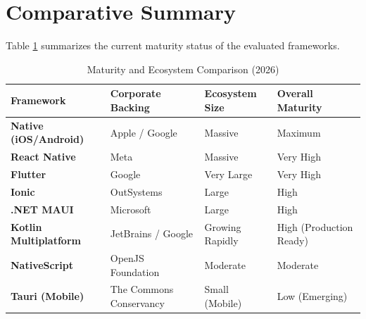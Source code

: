 \section{Comparative Summary}

Table \ref{tab:maturity_summary} summarizes the current maturity status of the evaluated frameworks.

\begin{table}[h]
\centering
\caption{Maturity and Ecosystem Comparison (2026)}
\label{tab:maturity_summary}
\renewcommand{\arraystretch}{1.3}
\begin{tabularx}{\textwidth}{|l|X|X|X|}
\hline
\textbf{Framework} & \textbf{Corporate Backing} & \textbf{Ecosystem Size} & \textbf{Overall Maturity} \\ \hline
\textbf{Native (iOS/Android)} & Apple / Google & Massive & Maximum \\ \hline
\textbf{React Native} & Meta & Massive & Very High \\ \hline
\textbf{Flutter} & Google & Very Large & Very High \\ \hline
\textbf{Ionic} & OutSystems & Large & High \\ \hline
\textbf{.NET MAUI} & Microsoft & Large & High \\ \hline
\textbf{Kotlin Multiplatform} & JetBrains / Google & Growing Rapidly & High (Production Ready) \\ \hline
\textbf{NativeScript} & OpenJS Foundation & Moderate & Moderate \\ \hline
\textbf{Tauri (Mobile)} & The Commons Conservancy & Small (Mobile) & Low (Emerging) \\ \hline
\end{tabularx}
\end{table}
